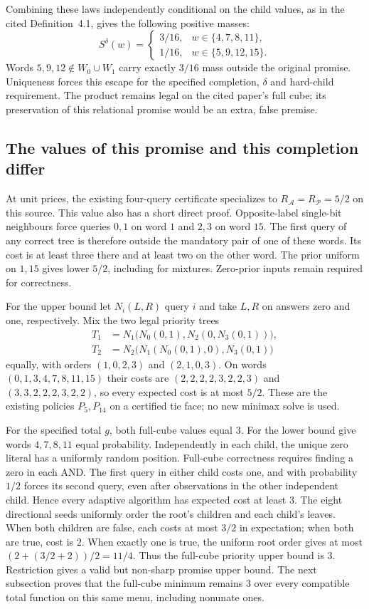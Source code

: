 Combining these laws independently conditional on the child values,
as in the cited Definition~4.1, gives the following positive masses:
\[
 S^\delta(w)=
 \begin{cases}
  3/16,&w\in\{4,7,8,11\},\\
  1/16,&w\in\{5,9,12,15\}.
 \end{cases}
\]
Words $5,9,12\notin W_0\cup W_1$ carry exactly $3/16$ mass
outside the original promise. Uniqueness forces this escape for the
specified completion, $\delta$ and hard-child requirement. The product
remains legal on the cited paper's full cube; its preservation of this
relational promise would be an extra, false premise.

\subsection{The values of this promise and this completion differ}
At unit prices, the existing four-query certificate specializes to
$R_{\mathcal A}=R_{\mathcal P}=5/2$ on this source. This value also has
a short direct proof. Opposite-label single-bit neighbours force queries
$0,1$ on word $1$ and $2,3$ on word $15$. The first query of any correct
tree is therefore outside the mandatory pair of one of these words.
Its cost is at least three there and at least two on the other word.
The prior uniform on $1,15$ gives lower $5/2$, including for mixtures.
Zero-prior inputs remain required for correctness.

For the upper bound let $N_i(L,R)$ query $i$ and take $L,R$ on answers
zero and one, respectively. Mix the two legal priority trees
\[
 \begin{split}
 T_1&=N_1\bigl(N_0(0,1),N_2(0,N_3(0,1))\bigr),\\
 T_2&=N_2\bigl(N_1(N_0(0,1),0),N_3(0,1)\bigr)
 \end{split}
\]
equally, with orders $(1,0,2,3)$ and $(2,1,0,3)$. On words
$(0,1,3,4,7,8,11,15)$ their costs are $(2,2,2,2,3,2,2,3)$ and
$(3,3,2,2,2,3,2,2)$, so every expected cost is at most $5/2$.
These are the existing policies $P_5,P_{14}$ on a certified tie face;
no new minimax solve is used.

For the specified total $g$, both full-cube values equal $3$.
For the lower bound give words $4,7,8,11$ equal probability. Independently
in each child, the unique zero literal has a uniformly random position.
Full-cube correctness requires finding a zero in each AND. The first
query in either child costs one, and with probability $1/2$ forces its
second query, even after observations in the other independent child.
Hence every adaptive algorithm has expected cost at least $3$.
The eight directional seeds uniformly order the root's children and each
child's leaves. When both children are false, each costs at most $3/2$
in expectation; when both are true, cost is $2$. When exactly one is true,
the uniform root order gives at most $(2+(3/2+2))/2=11/4$. Thus the
full-cube priority upper bound is $3$.
Restriction gives a valid but non-sharp promise upper bound. The next
subsection proves that the full-cube minimum remains $3$ over every
compatible total function on this same menu, including nonunate ones.

